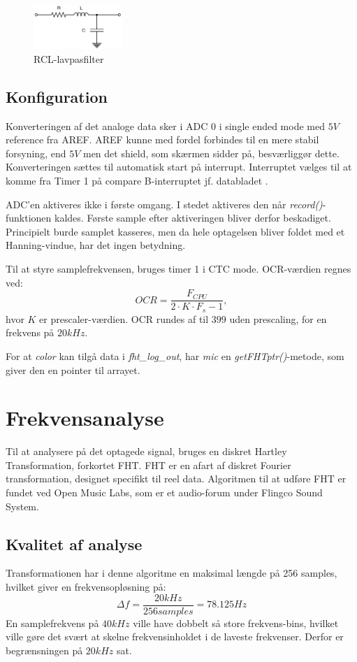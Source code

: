 \begin{figure}[H]
	\center
	\includegraphics[width=0.3\textwidth]{Figur/RCL_diagram.pdf}
	\caption{RCL-lavpasfilter}
	\label{fig:RCL}
\end{figure}

\subsection{Konfiguration}
Konverteringen af det analoge data sker i ADC 0 i single ended mode med $5 V$ reference fra AREF. 
AREF kunne med fordel forbindes til en mere stabil forsyning, end $5 V$ men det shield, som skærmen sidder på, besværliggør dette. 
Konverteringen sættes til automatisk start på interrupt. 
Interruptet vælges til at komme fra Timer 1 på compare B-interruptet jf. databladet \cite{manual_arduino}.

ADC'en aktiveres ikke i første omgang. 
I stedet aktiveres den når \textit{record()}-funktionen kaldes. 
Første sample efter aktiveringen bliver derfor beskadiget.
Principielt burde samplet kasseres, men da hele optagelsen bliver foldet med et Hanning-vindue, har det ingen betydning. 

Til at styre samplefrekvensen, bruges timer 1 i CTC mode. 
OCR-værdien regnes ved: $$ OCR = \frac{F_{CPU}}{2 \cdot K \cdot F_s - 1}, $$ hvor $K$ er prescaler-værdien.
OCR rundes af til $399 $ uden prescaling, for en frekvens på $20 kHz$. 

For at \textit{color} kan tilgå data i \textit{fht\_log\_out}, har \textit{mic} en \textit{getFHTptr()}-metode, som giver den en pointer til arrayet. 

\section{Frekvensanalyse}
Til at analysere på det optagede signal, bruges en diskret Hartley Transformation, forkortet FHT. 
FHT er en afart af diskret Fourier transformation, designet specifikt til reel data. 
Algoritmen til at udføre FHT er fundet ved Open Music Labs, som er et audio-forum under Flingco Sound System. \cite{fht_arduino}

\subsection{Kvalitet af analyse}
Transformationen har i denne algoritme en maksimal længde på 256 samples, hvilket giver en frekvensopløsning på: $$ \Delta f = \frac{20 kHz}{256 samples} = 78.125 Hz$$ 
En samplefrekvens på $ 40 kHz$ ville have dobbelt så store frekvens-bins, hvilket ville gøre det svært at skelne frekvensinholdet i de laveste frekvenser. 
Derfor er begrænsningen på $20 kHz $ sat. 

